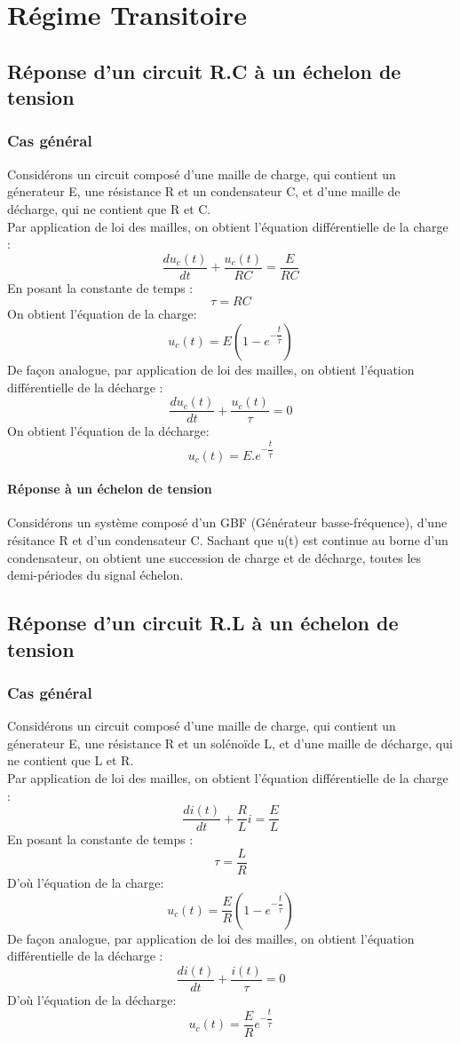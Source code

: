 \chapter{Régime Transitoire}
\section{Réponse d'un circuit R.C à un échelon de tension}
\subsection{Cas général}
Considérons un circuit composé d'une maille de charge, qui contient un génerateur E, une résistance R et un condensateur C, et d'une maille de décharge, qui ne contient que R et C.\\
Par application de loi des mailles, on obtient l'équation différentielle de la charge :
$$\dfrac{du_c(t)}{dt} + \dfrac{u_c(t)}{RC} = \dfrac{E}{RC}$$
En posant la constante de temps : $$\tau = RC$$
On obtient l'équation de la charge:
$$u_c(t) = E(1-e^{-\dfrac{t}{\tau}})$$
De façon analogue, par application de loi des mailles, on obtient l'équation différentielle de la décharge :
$$\dfrac{du_c(t)}{dt} + \dfrac{u_c(t)}{\tau} = 0$$
On obtient l'équation de la décharge:
$$u_c(t) = E.e^{-\dfrac{t}{\tau}}$$
\subsubsection{Réponse à un échelon de tension}
Considérons un système composé d'un GBF (Générateur basse-fréquence), d'une résitance R et d'un condensateur C.
Sachant que u(t) est continue au borne d'un condensateur, on obtient une succession de charge et de décharge, toutes les demi-périodes du signal échelon.
\section{Réponse d'un circuit R.L à un échelon de tension}
\subsection{Cas général}
Considérons un circuit composé d'une maille de charge, qui contient un génerateur E, une résistance R et un solénoïde L, et d'une maille de décharge, qui ne contient que L et R.\\
Par application de loi des mailles, on obtient l'équation différentielle de la charge :
$$\dfrac{di(t)}{dt} + \dfrac{R}{L}i = \dfrac{E}{L}$$
En posant la constante de temps : $$\tau = \dfrac{L}{R}$$
D'où l'équation de la charge:
$$u_c(t) = \dfrac{E}{R}(1-e^{-\dfrac{t}{\tau}})$$
De façon analogue, par application de loi des mailles, on obtient l'équation différentielle de la décharge :
$$\dfrac{di(t)}{dt} + \dfrac{i(t)}{\tau} = 0$$
D'où l'équation de la décharge:
$$u_c(t) = \dfrac{E}{R}e^{-\dfrac{t}{\tau}}$$
